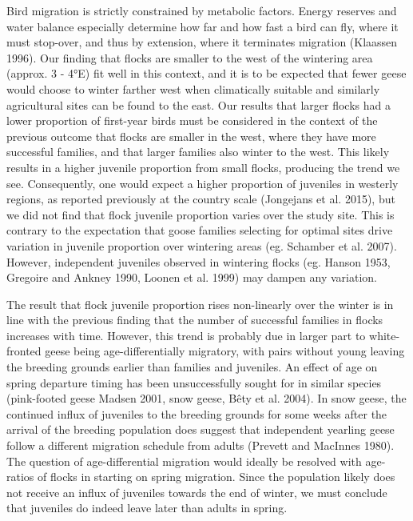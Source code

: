 \documentclass[10pt,twocolumn]{paper}
\begin{document}
Bird migration is strictly constrained by metabolic factors. Energy
reserves and water balance especially determine how far and how fast a
bird can fly, where it must stop-over, and thus by extension, where it
terminates migration (Klaassen 1996). Our finding that flocks are
smaller to the west of the wintering area (approx. 3 - 4°E) fit well in
this context, and it is to be expected that fewer geese would choose to
winter farther west when climatically suitable and similarly
agricultural sites can be found to the east. Our results that larger
flocks had a lower proportion of first-year birds must be considered in
the context of the previous outcome that flocks are smaller in the west,
where they have more successful families, and that larger families also
winter to the west. This likely results in a higher juvenile proportion
from small flocks, producing the trend we see. Consequently, one would
expect a higher proportion of juveniles in westerly regions, as reported
previously at the country scale (Jongejans et al. 2015), but we did not
find that flock juvenile proportion varies over the study site. This is
contrary to the expectation that goose families selecting for optimal
sites drive variation in juvenile proportion over wintering areas (eg.
Schamber et al. 2007). However, independent juveniles observed in
wintering flocks (eg. Hanson 1953, Gregoire and Ankney 1990, Loonen et
al. 1999) may dampen any variation.

The result that flock juvenile proportion rises non-linearly over the
winter is in line with the previous finding that the number of
successful families in flocks increases with time. However, this trend
is probably due in larger part to white-fronted geese being
age-differentially migratory, with pairs without young leaving the
breeding grounds earlier than families and juveniles. An effect of age
on spring departure timing has been unsuccessfully sought for in similar
species (pink-footed geese Madsen 2001, snow geese, Bêty et al. 2004).
In snow geese, the continued influx of juveniles to the breeding grounds
for some weeks after the arrival of the breeding population does suggest
that independent yearling geese follow a different migration schedule
from adults (Prevett and MacInnes 1980). The question of
age-differential migration would ideally be resolved with age-ratios of
flocks in starting on spring migration. Since the population likely does
not receive an influx of juveniles towards the end of winter, we must
conclude that juveniles do indeed leave later than adults in spring.
\end{document}
